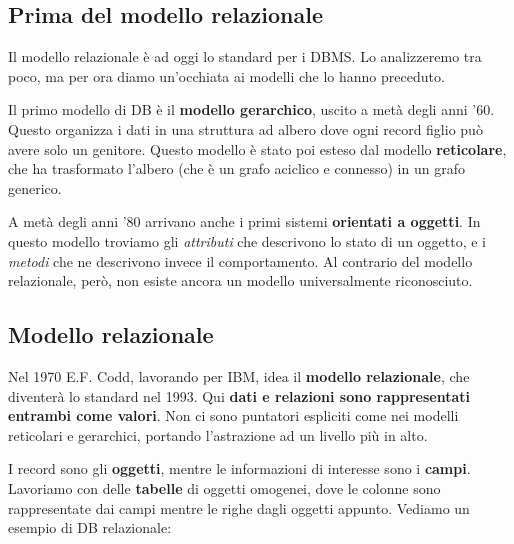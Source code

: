 \documentclass[11pt, a4paper, titlepage, oneside]{scrbook}
\begin{document}
\subsection{Prima del modello relazionale}

Il modello relazionale è ad oggi lo standard per i DBMS. Lo analizzeremo tra poco, ma per ora diamo un'occhiata ai modelli che lo hanno preceduto.

Il primo modello di DB è il \textbf{modello gerarchico}, uscito a metà degli anni '60. Questo organizza i dati in una struttura ad albero dove ogni record figlio può avere solo un genitore. Questo modello è stato poi esteso dal modello \textbf{reticolare}, che ha trasformato l'albero (che è un grafo aciclico e connesso) in un grafo generico.

A metà degli anni '80 arrivano anche i primi sistemi \textbf{orientati a oggetti}. In questo modello troviamo gli \textit{attributi} che descrivono lo stato di un oggetto, e i \textit{metodi} che ne descrivono invece il comportamento. Al contrario del modello relazionale, però, non esiste ancora un modello universalmente riconosciuto.

\subsection{Modello relazionale}

\begin{Definizione}
\label{def-modello-relazionale}
Nel 1970 E.F. Codd, lavorando per IBM, idea il \textbf{modello relazionale}, che diventerà lo standard nel 1993. Qui \textbf{dati e relazioni sono rappresentati entrambi come valori}. Non ci sono puntatori espliciti come nei modelli reticolari e gerarchici, portando l'astrazione ad un livello più in alto.
\end{Definizione}

I record sono gli \textbf{oggetti}, mentre le informazioni di interesse sono i \textbf{campi}. Lavoriamo con delle \textbf{tabelle} di oggetti omogenei, dove le colonne sono rappresentate dai campi mentre le righe dagli oggetti appunto. Vediamo un esempio di DB relazionale:

\newpage
\end{document}
